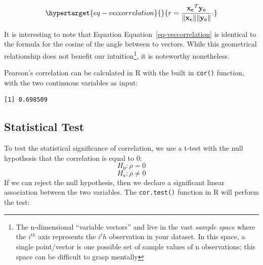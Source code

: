 \documentclass[
  letterpaper,
  DIV=11,
  numbers=noendperiod]{scrreprt}
\newenvironment{Shaded}{\begin{snugshade}}{\end{snugshade}}
\newcommand{\FunctionTok}[1]{\textcolor[rgb]{0.28,0.35,0.67}{#1}}
\newcommand{\NormalTok}[1]{\textcolor[rgb]{0.00,0.23,0.31}{#1}}
\newcommand{\SpecialCharTok}[1]{\textcolor[rgb]{0.37,0.37,0.37}{#1}}
\begin{document}
\begin{equation}\protect\hypertarget{eq-veccorrelation}{}{
r = \frac{\mathbf{x_c}^T\mathbf{y_c}}{\|\mathbf{x_c}\|\|\mathbf{y_c}\|}.
}\label{eq-veccorrelation}\end{equation}

It is interesting to note that Equation Equation~\ref{eq-veccorrelation}
is identical to the formula for the cosine of the angle between to
vectors. While this geometrical relationship does not benefit our
intuition\footnote{The n-dimensional ``variable vectors'' 
  and  live in the vast \emph{sample space} where the
  \(i^{th}\) axis represents the \(i^th\) observation in your dataset.
  In this space, a single point/vector is one possible set of sample
  values of n observations; this space can be difficult to grasp
  mentally}, it is noteworthy nonetheless.

Pearson's correlation can be calculated in R with the built in
\texttt{cor()} function, with the two continuous variables as input:

\begin{Shaded}
\end{Shaded}

\begin{verbatim}
[1] 0.698509
\end{verbatim}

\hypertarget{sec-testcor}{%
\subsection{Statistical Test}\label{sec-testcor}}

To test the statistical significance of correlation, we use a t-test
with the null hypothesis that the correlation is equal to 0:
\[H_0: \rho = 0\] \[H_a: \rho \neq 0\] If we can reject the null
hypothesis, then we declare a significant linear association between the
two variables. The \texttt{cor.test()} function in R will perform the
test:

\begin{Shaded}
\end{Shaded}
\end{document}
